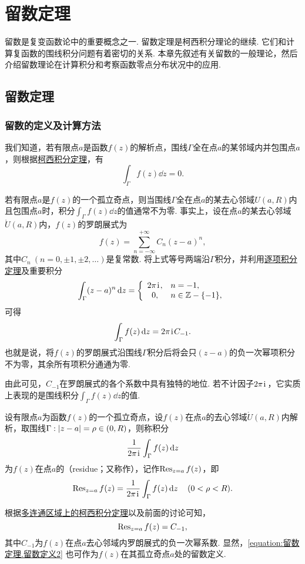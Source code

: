 \chapter{留数定理}
留数是复变函数论中的重要概念之一.
留数定理是柯西积分理论的继续.
它们和计算复函数的围线积分问题有着密切的关系.
本章先叙述有关留数的一般理论，然后介绍留数理论在计算积分和考察函数零点分布状况中的应用.

\section{留数定理}
\subsection{留数的定义及计算方法}
我们知道，若有限点\(a\)是函数\(f(z)\)的解析点，围线\(\Gamma\)全在点\(a\)的某邻域内并包围点\(a\)，则根据\hyperref[theorem:解析函数的积分表示.柯西积分定理]{柯西积分定理}，有\[
\int_{\Gamma} f(z) \dd{z} = 0.
\]

若有限点\(a\)是\(f(z)\)的一个孤立奇点，则当围线\(\Gamma\)全在点\(a\)的某去心邻域\(U(a,R)\)内且包围点\(a\)时，积分\(\int_{\Gamma} f(z) \dd{z}\)的值通常不为零.
事实上，设在点\(a\)的某去心邻域\(\mathring{U}(a,R)\)内，\(f(z)\)的罗朗展式为\[
f(z) = \sum\limits_{n=-\infty}^{+\infty} C_n (z-a)^n,
\]其中\(C_n\ (n=0,\pm1,\pm2,\dotsc)\)是复常数.
将上式等号两端沿\(\Gamma\)积分，并利用\hyperref[theorem:解析函数的级数表示.一致收敛级数的基本性质2]{逐项积分定理}及重要积分 \[
\int_{\Gamma} (z-a)^n \dd{z} = \left\{ \begin{array}{cl}
2\pi\kern1pt\mathrm{i}\kern1pt, & n=-1, \\
0,& n\in\mathbb{Z}-\{-1\},
\end{array} \right.
\]可得\[
\int_{\Gamma} f(z) \dd{z} = 2\pi\kern1pt\mathrm{i}\kern1pt C_{-1}.
\]也就是说，将\(f(z)\)的罗朗展式沿围线\(\Gamma\)积分后将会只\((z-a)\)的负一次幂项积分不为零，其余所有项积分通通为零.

由此可见，\(C_{-1}\)在罗朗展式的各个系数中具有独特的地位.
若不计因子\(2\pi\kern1pt\mathrm{i}\kern1pt\)，它实质上表现的是围线积分\(\int_{\Gamma} f(z) \dd{z}\)的值.

\begin{definition}
设有限点\(a\)为函数\(f(z)\)的一个孤立奇点，设\(f(z)\)在点\(a\)的去心邻域\(\mathring{U}(a,R)\)内解析，取围线\(\Gamma: \abs{z-a}=\rho\in(0,R)\)，则称积分\[
\frac{1}{2\pi\kern1pt\mathrm{i}\kern1pt} \int_{\Gamma} f(z) \dd{z}
\]为\(f(z)\)在点\(a\)的（residue；又称作），记作\(\operatorname{Res}_{z=a} f(z)\)，即\begin{equation}\label{equation:留数定理.留数定义1}
\operatorname{Res}_{z=a} f(z)
= \frac{1}{2\pi\kern1pt\mathrm{i}\kern1pt} \int_{\Gamma} f(z) \dd{z}
\quad(0<\rho<R).
\end{equation}
\end{definition}
根据\hyperref[theorem:解析函数的积分表示.多连通区域的柯西积分定理]{多连通区域上的柯西积分定理}以及前面的讨论可知，\begin{equation}\label{equation:留数定理.留数定义2}
\operatorname{Res}_{z=a} f(z) = C_{-1},
\end{equation}
其中\(C_{-1}\)为\(f(z)\)在点\(a\)去心邻域内罗朗展式的负一次幂系数.
显然，\cref{equation:留数定理.留数定义2} 也可作为\(f(z)\)在其孤立奇点\(a\)处的留数定义.

